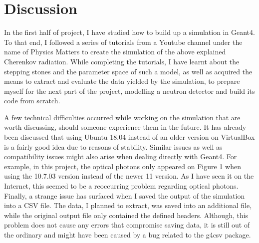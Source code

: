 \documentclass[12pt,twocolumn]{article}
\begin{document}
\section{Discussion}

In the first half of project, I have studied how to build up a simulation in Geant4. To that end, I followed a series of tutorials from a Youtube channel under the name of Physics Matters \cite{youtube} to create the simulation of the above explained Cherenkov radiation. While completing the tutorials, I have learnt about the stepping stones and the parameter space of such a model, as well as acquired the means to extract and evaluate the data yielded by the simulation, to prepare myself for the next part of the project, modelling a neutron detector and build its code from scratch.

A few technical difficulties occurred while working on the simulation that are worth discussing, should someone experience them in the future. It has already been discussed that using Ubuntu 18.04 instead of an older version on VirtualBox is a fairly good idea due to reasons of stability. Similar issues as well as compatibility issues might also arise when dealing directly with Geant4. For example, in this project, the optical photons only appeared on Figure 1 when using the 10.7.03 version instead of the newer 11 version. As I have seen it on the Internet, this seemed to be a reoccurring problem regarding optical photons. Finally, a strange issue has surfaced when I saved the output of the simulation into a CSV file. The data, I planned to extract, was saved into an additional file, while the original output file only contained the defined headers. Although, this problem does not cause any errors that compromise saving data, it is still out of the ordinary and might have been caused by a bug related to the g4csv package.




\end{document}

